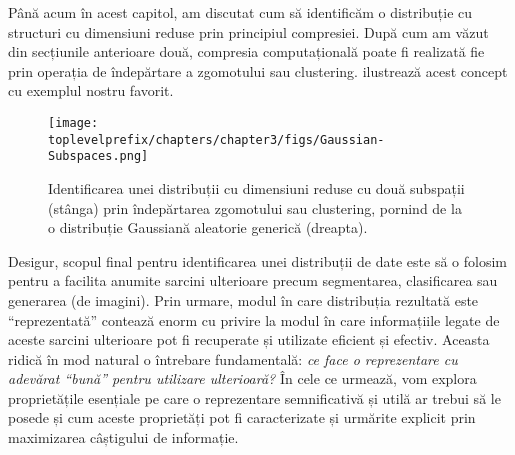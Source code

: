 \documentclass[../../book-main_ro.tex]{subfiles}
\begin{document}
Până acum în acest capitol, am discutat cum să identificăm o distribuție cu structuri cu dimensiuni reduse prin principiul compresiei. După cum am văzut din secțiunile anterioare două, compresia computațională poate fi realizată fie prin operația de îndepărtare a zgomotului sau clustering.  ilustrează acest concept cu exemplul nostru favorit.
\begin{figure}[t]
    \centering
    \texttt{[image: \\toplevelprefix/chapters/chapter3/figs/Gaussian-Subspaces.png]}
    \caption{Identificarea unei distribuții cu dimensiuni reduse cu două subspații (stânga) prin îndepărtarea zgomotului sau clustering, pornind de la o distribuție Gaussiană aleatorie generică (dreapta).}
    \label{fig:Gaussian-Subspaces}
\end{figure}
Desigur, scopul final pentru identificarea unei distribuții de date este să o folosim pentru a facilita anumite sarcini ulterioare precum segmentarea, clasificarea sau generarea (de imagini). Prin urmare, modul în care distribuția rezultată este ``reprezentată'' contează enorm cu privire la modul în care informațiile legate de aceste sarcini ulterioare pot fi recuperate și utilizate eficient și efectiv. Aceasta ridică în mod natural o întrebare fundamentală: {\em ce face o reprezentare cu adevărat ``bună'' pentru utilizare ulterioară?} În cele ce urmează, vom explora proprietățile esențiale pe care o reprezentare semnificativă și utilă ar trebui să le posede și cum aceste proprietăți pot fi caracterizate și urmărite explicit prin maximizarea câștigului de informație.
\end{document}
